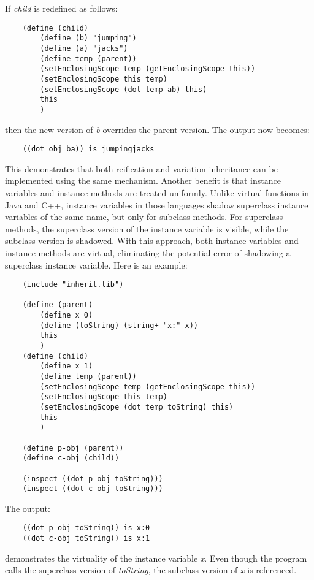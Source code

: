 If {\it child} is redefined as follows:

\begin{verbatim}
    (define (child)
        (define (b) "jumping")
        (define (a) "jacks")
        (define temp (parent))
        (setEnclosingScope temp (getEnclosingScope this))
        (setEnclosingScope this temp)
        (setEnclosingScope (dot temp ab) this)
        this
        )
\end{verbatim}

then the new version of {\it b} overrides the parent version.  The output
now becomes:

\begin{verbatim}
    ((dot obj ba)) is jumpingjacks 
\end{verbatim}

This demonstrates that both reification and variation inheritance can be
implemented using the same mechanism.  Another benefit is that instance
variables and instance methods are treated uniformly. Unlike virtual
functions in Java and C++, instance variables in those languages shadow
superclass instance variables of the same name, but only for subclass
methods.  For superclass methods, the superclass version of the instance
variable is visible, while the subclass version is shadowed.  With this
approach, both instance variables and instance methods are virtual,
eliminating the potential error of shadowing a superclass instance
variable. Here is an example:

\begin{verbatim}
    (include "inherit.lib")

    (define (parent)
        (define x 0)
        (define (toString) (string+ "x:" x))
        this
        )
    (define (child)
        (define x 1)
        (define temp (parent))
        (setEnclosingScope temp (getEnclosingScope this))
        (setEnclosingScope this temp)
        (setEnclosingScope (dot temp toString) this)
        this
        )

    (define p-obj (parent))
    (define c-obj (child))

    (inspect ((dot p-obj toString)))
    (inspect ((dot c-obj toString)))
\end{verbatim}

The output:

\begin{verbatim}
    ((dot p-obj toString)) is x:0
    ((dot c-obj toString)) is x:1
\end{verbatim}

demonstrates the virtuality of the instance variable \emph{x}.  Even
though the program calls the superclass version of \emph{toString},
the subclass version of \emph{x} is referenced.

